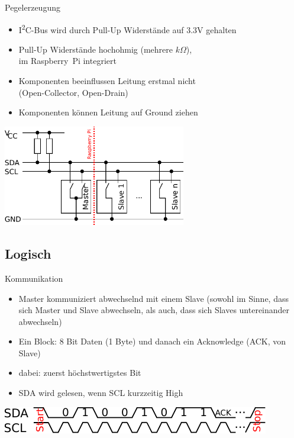 \documentclass{beamer}
\newcommand{\ItC}{I\textsuperscript{2}C\xspace}
\newcommand{\RPi}{Raspberry~Pi\xspace}
\begin{document}
\begin{frame}{Pegelerzeugung}
 \begin{itemize}
   \item \ItC-Bus wird durch Pull-Up Widerstände auf 3.3V gehalten
   \item Pull-Up Widerstände hochohmig (mehrere $k\Omega$),\\im \RPi  integriert
   \item Komponenten beeinflussen Leitung erstmal nicht\\(Open-Collector, Open-Drain)
   \item Komponenten können Leitung auf Ground ziehen
 \end{itemize}
 \begin{center}
  \includegraphics[width=0.6\textwidth]{bus-mit-pull}
 \end{center}
\end{frame}

\subsection{Logisch}

\begin{frame}{Kommunikation}
 \begin{itemize}
  \item Master kommuniziert abwechselnd mit einem Slave (sowohl im Sinne, dass sich Master und Slave abwechseln, als auch, dass sich Slaves untereinander abwechseln)
  \item Ein Block: 8 Bit Daten (1 Byte) und danach ein Acknowledge (ACK, von Slave)
  \item dabei: zuerst höchstwertigstes Bit
  \item SDA wird gelesen, wenn SCL kurzzeitig High
 \end{itemize}
 \includegraphics[width=\textwidth]{bus-logisch}
\end{frame}
\end{document}
